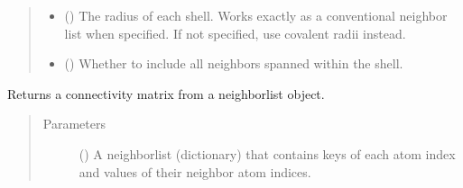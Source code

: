 \documentclass[letterpaper,10pt,english]{sphinxmanual}
\begin{document}
\begin{fulllineitems}
\begin{quote}
\begin{description}
\begin{itemize}
\item {} 
 (\sphinxstyleliteralemphasis{\sphinxupquote{, }}) \textendash{} The radius of each shell. Works exactly as a conventional
neighbor list when specified. If not specified, use covalent
radii instead.

\item {} 
 (\sphinxstyleliteralemphasis{\sphinxupquote{, }}) \textendash{} Whether to include all neighbors spanned within the shell.

\end{itemize}

\end{description}\end{quote}

\end{fulllineitems}


\begin{fulllineitems}
\label{\detokenize{utilities:acat.utilities.get_connectivity_matrix}}
Returns a connectivity matrix from a neighborlist object.
\begin{quote}\begin{description}
\item[{Parameters}] \leavevmode
{} () \textendash{} A neighborlist (dictionary) that contains keys of each
atom index and values of their neighbor atom indices.

\end{description}\end{quote}

\end{fulllineitems}

\end{document}
